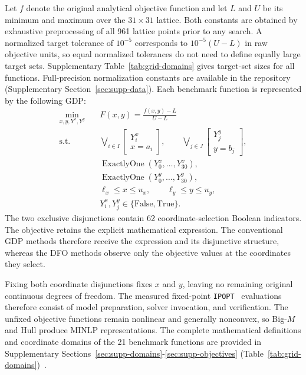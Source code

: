 \documentclass{article}
\begin{document}
Let \(f\) denote the original analytical objective function and let \(L\) and \(U\) be its minimum and maximum over the \(31\times31\) lattice.
Both constants are obtained by exhaustive preprocessing of all 961 lattice points prior to any search.
A normalized target tolerance of \(10^{-5}\) corresponds to \(10^{-5}(U-L)\) in raw objective units, so equal normalized tolerances do not need to define equally large target sets.
Supplementary Table~\ref{tab:grid-domains} gives target-set sizes for all functions.
Full-precision normalization constants are available in the repository (Supplementary Section~\ref{sec:supp-data}).
Each benchmark function is represented by the following GDP:
\begin{equation}\label{eqn:grid-gdp}
\begin{aligned}
\min_{x,y,Y^x,Y^y}\quad & F(x,y)=\frac{f(x,y)-L}{U-L}\\
\mathrm{s.t.}\quad &
\bigvee_{i\in I}\left[\begin{array}{c}Y_i^x\\x=a_i\end{array}\right],\qquad
\bigvee_{j\in J}\left[\begin{array}{c}Y_j^y\\y=b_j\end{array}\right],\\
&\operatorname{ExactlyOne}(Y_0^x,\ldots,Y_{30}^x),\\
&\operatorname{ExactlyOne}(Y_0^y,\ldots,Y_{30}^y),\\
&\ell_x\leq x\leq u_x,\qquad \ell_y\leq y\leq u_y,\\
&Y_i^x,Y_j^y\in\{\mathrm{False},\mathrm{True}\}.
\end{aligned}
\end{equation}
The two exclusive disjunctions contain 62 coordinate-selection Boolean indicators.
The objective retains the explicit mathematical expression.
The conventional GDP methods therefore receive the expression and its disjunctive structure, whereas the DFO methods observe only the objective values at the coordinates they select.

Fixing both coordinate disjunctions fixes \(x\) and \(y\), leaving no remaining original continuous degrees of freedom.
The measured fixed-point \texttt{IPOPT}~\citep{wachter2006implementation} evaluations therefore consist of model preparation, solver invocation, and verification.
The unfixed objective functions remain nonlinear and generally nonconvex, so Big-\(M\) and Hull produce MINLP representations.
The complete mathematical definitions and coordinate domains of the 21 benchmark functions are provided in Supplementary Sections~\ref{sec:supp-domains}-\ref{sec:supp-objectives} (Table~\ref{tab:grid-domains})~\citep{rbfoptTestArchive,qhdBenchmarks}.
\end{document}
